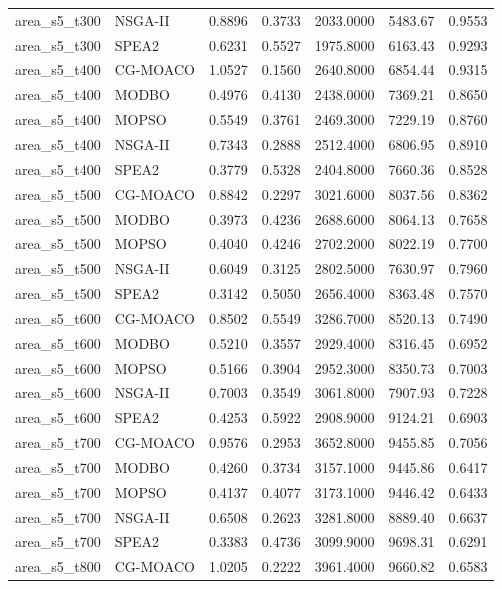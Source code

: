 \begin{longtable}{llrrrrr}
area\_s5\_t300 & NSGA-II & 0.8896 & 0.3733 & 2033.0000 & 5483.67 & 0.9553 \\
area\_s5\_t300 & SPEA2 & 0.6231 & 0.5527 & 1975.8000 & 6163.43 & 0.9293 \\
area\_s5\_t400 & CG-MOACO & 1.0527 & 0.1560 & 2640.8000 & 6854.44 & 0.9315 \\
area\_s5\_t400 & MODBO & 0.4976 & 0.4130 & 2438.0000 & 7369.21 & 0.8650 \\
area\_s5\_t400 & MOPSO & 0.5549 & 0.3761 & 2469.3000 & 7229.19 & 0.8760 \\
area\_s5\_t400 & NSGA-II & 0.7343 & 0.2888 & 2512.4000 & 6806.95 & 0.8910 \\
area\_s5\_t400 & SPEA2 & 0.3779 & 0.5328 & 2404.8000 & 7660.36 & 0.8528 \\
area\_s5\_t500 & CG-MOACO & 0.8842 & 0.2297 & 3021.6000 & 8037.56 & 0.8362 \\
area\_s5\_t500 & MODBO & 0.3973 & 0.4236 & 2688.6000 & 8064.13 & 0.7658 \\
area\_s5\_t500 & MOPSO & 0.4040 & 0.4246 & 2702.2000 & 8022.19 & 0.7700 \\
area\_s5\_t500 & NSGA-II & 0.6049 & 0.3125 & 2802.5000 & 7630.97 & 0.7960 \\
area\_s5\_t500 & SPEA2 & 0.3142 & 0.5050 & 2656.4000 & 8363.48 & 0.7570 \\
area\_s5\_t600 & CG-MOACO & 0.8502 & 0.5549 & 3286.7000 & 8520.13 & 0.7490 \\
area\_s5\_t600 & MODBO & 0.5210 & 0.3557 & 2929.4000 & 8316.45 & 0.6952 \\
area\_s5\_t600 & MOPSO & 0.5166 & 0.3904 & 2952.3000 & 8350.73 & 0.7003 \\
area\_s5\_t600 & NSGA-II & 0.7003 & 0.3549 & 3061.8000 & 7907.93 & 0.7228 \\
area\_s5\_t600 & SPEA2 & 0.4253 & 0.5922 & 2908.9000 & 9124.21 & 0.6903 \\
area\_s5\_t700 & CG-MOACO & 0.9576 & 0.2953 & 3652.8000 & 9455.85 & 0.7056 \\
area\_s5\_t700 & MODBO & 0.4260 & 0.3734 & 3157.1000 & 9445.86 & 0.6417 \\
area\_s5\_t700 & MOPSO & 0.4137 & 0.4077 & 3173.1000 & 9446.42 & 0.6433 \\
area\_s5\_t700 & NSGA-II & 0.6508 & 0.2623 & 3281.8000 & 8889.40 & 0.6637 \\
area\_s5\_t700 & SPEA2 & 0.3383 & 0.4736 & 3099.9000 & 9698.31 & 0.6291 \\
area\_s5\_t800 & CG-MOACO & 1.0205 & 0.2222 & 3961.4000 & 9660.82 & 0.6583 \\

\end{longtable}
